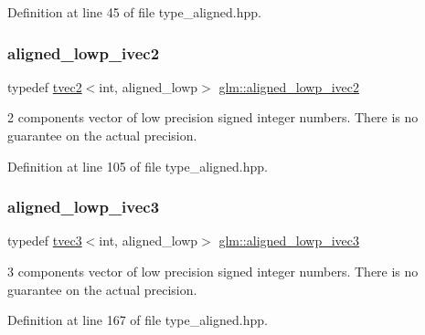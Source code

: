 Definition at line 45 of file type\+\_\+aligned.\+hpp.

\mbox{\label{group__gtc__type__aligned_gaa68001df1954981214e828384e776d8e}} 
\subsubsection{\texorpdfstring{aligned\_lowp\_ivec2}{aligned\_lowp\_ivec2}}
{\footnotesize\ttfamily typedef \mbox{\hyperlink{structglm_1_1tvec2}{tvec2}}$<$int, aligned\+\_\+lowp$>$ \mbox{\hyperlink{group__gtc__type__aligned_gaa68001df1954981214e828384e776d8e}{glm\+::aligned\+\_\+lowp\+\_\+ivec2}}}

2 components vector of low precision signed integer numbers. There is no guarantee on the actual precision. 

Definition at line 105 of file type\+\_\+aligned.\+hpp.

\mbox{\label{group__gtc__type__aligned_ga1d549dde64a05e6fcbc23a73563a077c}} 
\subsubsection{\texorpdfstring{aligned\_lowp\_ivec3}{aligned\_lowp\_ivec3}}
{\footnotesize\ttfamily typedef \mbox{\hyperlink{structglm_1_1tvec3}{tvec3}}$<$int, aligned\+\_\+lowp$>$ \mbox{\hyperlink{group__gtc__type__aligned_ga1d549dde64a05e6fcbc23a73563a077c}{glm\+::aligned\+\_\+lowp\+\_\+ivec3}}}

3 components vector of low precision signed integer numbers. There is no guarantee on the actual precision. 

Definition at line 167 of file type\+\_\+aligned.\+hpp.

\mbox{\label{group__gtc__type__aligned_ga7605da765c208f1008519a167dddd6d9}} 
